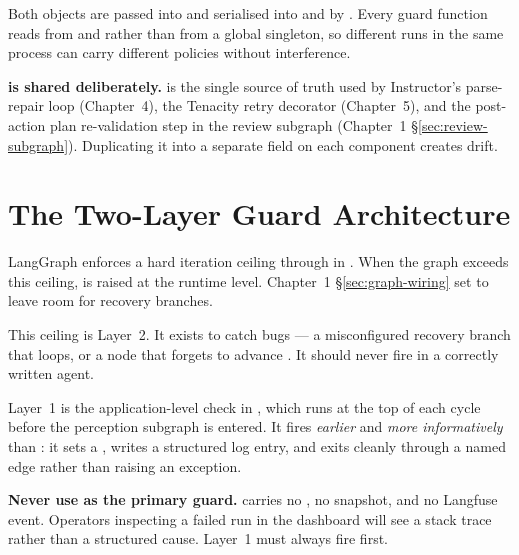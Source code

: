 \medskip
Both objects are passed into  and serialised
into  and  by
.  Every guard function reads from
 and  rather than
from a global singleton, so different runs in the same process can carry
different policies without interference.

\begin{notebox}
\textbf{ is shared deliberately.}
 is the single source of truth used
by Instructor's parse-repair loop (Chapter~4), the Tenacity retry
decorator (Chapter~5), and the post-action plan re-validation step in the
review subgraph (Chapter~1 §\ref{sec:review-subgraph}).  Duplicating it
into a separate field on each component creates drift.
\end{notebox}

\section{The Two-Layer Guard Architecture}
\label{sec:two-layer}

LangGraph enforces a hard iteration ceiling through 
in .  When the graph exceeds this ceiling,
 is raised at the runtime level.
Chapter~1 §\ref{sec:graph-wiring} set  to leave room for recovery branches.

This ceiling is Layer~2.  It exists to catch bugs --- a misconfigured
recovery branch that loops, or a node that forgets to advance
.  It should never fire in a correctly written agent.

Layer~1 is the application-level check in , which
runs at the top of each cycle before the perception subgraph is entered.
It fires \emph{earlier} and \emph{more informatively} than
: it sets a , writes a
structured log entry, and exits cleanly through a named edge rather than
raising an exception.

\begin{warningbox}
\textbf{Never use  as the primary guard.}
 carries no , no
 snapshot, and no Langfuse event.  Operators inspecting
a failed run in the dashboard will see a stack trace rather than a
structured cause.  Layer~1 must always fire first.
\end{warningbox}


